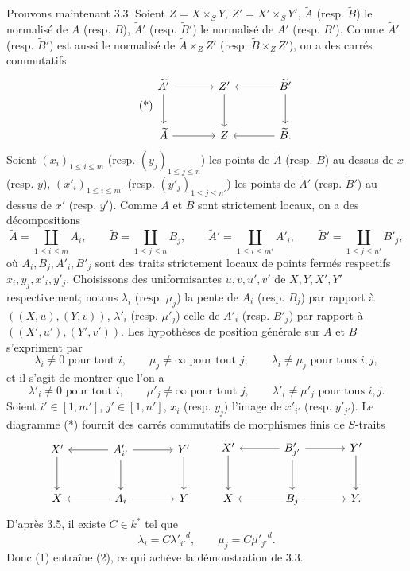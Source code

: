 \documentclass[11pt]{article}
\begin{document}
Prouvons maintenant 3.3. Soient $Z=X\times_SY$, $Z'=X'\times_SY'$, $\widetilde A$ (resp. $\widetilde B$) le normalisé de $A$ (resp. $B$), $\widetilde A'$ (resp. $\widetilde B'$) le normalisé de $A'$ (resp. $B'$). Comme $\widetilde A'$ (resp. $\widetilde B'$) est aussi le normalisé de $\widetilde A\times_ZZ'$ (resp. $\widetilde B\times_ZZ'$), on a des carrés commutatifs
\begin{equation}
\tag{*}
\begin{tikzcd}[column sep=large,row sep=large]
\widetilde A' \arrow[r] \arrow[d] & Z' \arrow[d] & \widetilde B' \arrow[l] \arrow[d]\\
\widetilde A \arrow[r] & Z & \widetilde B . \arrow[l]
\end{tikzcd}
\end{equation}
Soient $(x_i)_{1\le i\le m}$ (resp. $(y_j)_{1\le j\le n}$) les points de $\widetilde A$ (resp. $\widetilde B$) au-dessus de $x$ (resp. $y$), $(x'_i)_{1\le i\le m'}$ (resp. $(y'_j)_{1\le j\le n'}$) les points de $\widetilde A'$ (resp. $\widetilde B'$) au-dessus de $x'$ (resp. $y'$). Comme $A$ et $B$ sont strictement locaux, on a des décompositions
\[
\widetilde A=\coprod_{1\le i\le m}A_i,\qquad
\widetilde B=\coprod_{1\le j\le n}B_j,\qquad
\widetilde A'=\coprod_{1\le i\le m'}A'_i,\qquad
\widetilde B'=\coprod_{1\le j\le n'}B'_j,
\]
où $A_i,B_j,A'_i,B'_j$ sont des traits strictement locaux de points fermés respectifs $x_i,y_j,x'_i,y'_j$. Choisissons des uniformisantes $u,v,u',v'$ de $X,Y,X',Y'$ respectivement; notons $\lambda_i$ (resp. $\mu_j$) la pente de $A_i$ (resp. $B_j$) par rapport à $((X,u),(Y,v))$, $\lambda'_i$ (resp. $\mu'_j$) celle de $A'_i$ (resp. $B'_j$) par rapport à $((X',u'),(Y',v'))$. Les hypothèses de position générale sur $A$ et $B$ s'expriment par
\begin{equation}
\lambda_i\ne0\text{ pour tout }i,\qquad
\mu_j\ne\infty\text{ pour tout }j,\qquad
\lambda_i\ne\mu_j\text{ pour tous }i,j,
\tag{1}
\end{equation}
et il s'agit de montrer que l'on a
\begin{equation}
\lambda'_i\ne0\text{ pour tout }i,\qquad
\mu'_j\ne\infty\text{ pour tout }j,\qquad
\lambda'_i\ne\mu'_j\text{ pour tous }i,j.
\tag{2}
\end{equation}
Soient $i'\in[1,m']$, $j'\in[1,n']$, $x_i$ (resp. $y_j$) l'image de $x'_{i'}$ (resp. $y'_{j'}$). Le diagramme (*) fournit des carrés commutatifs de morphismes finis de $S$-traits
\[
\begin{tikzcd}[column sep=large,row sep=large]
X' \arrow[d] & A'_{i'} \arrow[l] \arrow[r] \arrow[d] & Y' \arrow[d]\\
X & A_i \arrow[l] \arrow[r] & Y
\end{tikzcd}
\qquad
\begin{tikzcd}[column sep=large,row sep=large]
X' \arrow[d] & B'_{j'} \arrow[l] \arrow[r] \arrow[d] & Y' \arrow[d]\\
X & B_j \arrow[l] \arrow[r] & Y .
\end{tikzcd}
\]
D'après 3.5, il existe $C\in k^*$ tel que
\[
\lambda_i=C{\lambda'_{i'}}^d,\qquad
\mu_j=C{\mu'_{j'}}^d.
\]
Donc (1) entraîne (2), ce qui achève la démonstration de 3.3.
\end{document}
